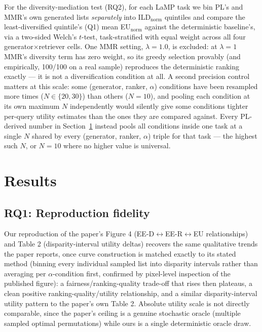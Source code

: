 \documentclass[10pt,twocolumn]{article}
\begin{document}
For the diversity-mediation test (RQ2), for each LaMP task we bin PL's and MMR's own
generated lists \emph{separately} into ILD$_{\text{norm}}$ quintiles and compare the
least-diversified quintile's (Q1) mean EU$_{\text{norm}}$ against the deterministic
baseline's, via a two-sided Welch's $t$-test, task-stratified with equal weight across
all four generator$\times$retriever cells. One MMR setting, $\lambda{=}1.0$, is
excluded: at $\lambda{=}1$ MMR's diversity term has zero weight, so its greedy
selection provably (and empirically, 100/100 on a real sample) reproduces the
deterministic ranking exactly --- it is not a diversification condition at all. A
second precision control matters at this scale: some (generator, ranker, $\alpha$)
conditions have been resampled more times ($N{\in}\{20,30\}$) than others ($N{=}10$),
and pooling each condition at its own maximum $N$ independently would silently give
some conditions tighter per-query utility estimates than the ones they are compared
against. Every PL-derived number in Section~\ref{sec:results} instead pools all
conditions inside one task at a single $N$ shared by every (generator, ranker,
$\alpha$) triple for that task --- the highest such $N$, or $N{=}10$ where no higher
value is universal.

\section{Results}
\label{sec:results}

\subsection{RQ1: Reproduction fidelity}
\label{sec:rq1}

Our reproduction of the paper's Figure 4 (EE-D$\leftrightarrow$EE-R$\leftrightarrow$EU
relationships) and Table 2 (disparity-interval utility deltas) recovers the same
qualitative trends the paper reports, once curve construction is matched exactly to
its stated method (binning every individual sampled list into disparity intervals
rather than averaging per $\alpha$-condition first, confirmed by pixel-level
inspection of the published figure): a fairness/ranking-quality trade-off that rises
then plateaus, a clean positive ranking-quality/utility relationship, and a similar
disparity-interval utility pattern to the paper's own Table 2. Absolute utility scale
is not directly comparable, since the paper's ceiling is a genuine stochastic oracle
(multiple sampled optimal permutations) while ours is a single deterministic oracle
draw.
\end{document}
